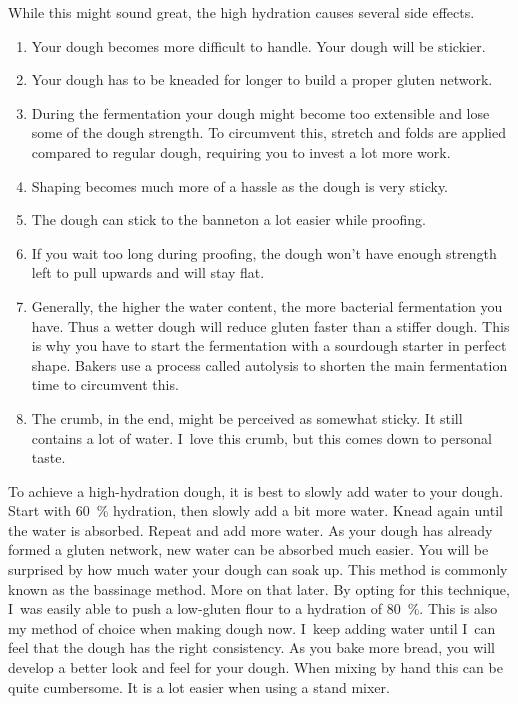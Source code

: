 While this might sound great, the high hydration causes several side effects.

\begin{enumerate}
  \item Your dough becomes more difficult to handle. Your dough will be stickier.
  \item Your dough has to be kneaded for longer to build a proper gluten
    network.
  \item During the fermentation your dough might become too extensible and lose
    some of the dough strength. To circumvent this, stretch and folds are applied
    compared to regular dough,
    requiring you to invest a lot more work.
  \item Shaping becomes much more of a hassle as the dough is very sticky.
  \item The dough can stick to the banneton a lot easier while proofing.
  \item If you wait too long during proofing, the dough won't have enough strength
    left to pull upwards and will stay flat.
  \item Generally, the higher the water content, the more bacterial fermentation you
    have. Thus a wetter dough will reduce gluten faster than a stiffer dough.
    This is why you have to start the fermentation with a sourdough starter in
    perfect shape. Bakers use a process called autolysis to shorten the main
    fermentation time to circumvent this.
  \item The crumb, in the end, might be perceived as somewhat sticky. It still
    contains a lot of water. I~love this crumb, but this comes down to personal
    taste.
\end{enumerate}

To achieve a high-hydration dough, it is best to slowly add water to
your dough. Start with \qty{60}{\percent} hydration, then slowly add a bit more water. Knead
again until the water is absorbed. Repeat and add more water. As your dough
has already formed a gluten network, new water can be absorbed much easier.
You will be surprised by how much water your dough can soak up. This
method is commonly known as the bassinage method. More on that later.
By opting for this technique, I~was easily able to push a low-gluten flour
to a hydration of \qty{80}{\percent}. This
is also my method of choice when making dough now. I~keep adding water until
I~can feel that the dough has the right consistency. As you bake more bread,
you will develop a better look and feel for your dough. When mixing
by hand this can be quite cumbersome. It is a lot easier when using a stand
mixer.

